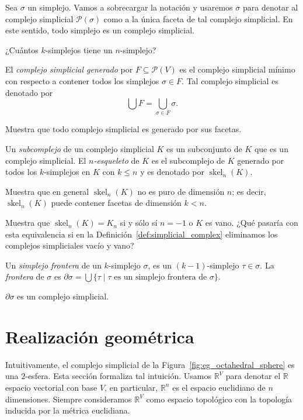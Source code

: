 \documentclass{standalone}
\begin{document}
	Sea $\sigma$ un simplejo. Vamos a sobrecargar la notación y usaremos $\sigma$ para denotar al complejo simplicial $\mathcal{P}(\sigma)$ como a la única faceta de tal complejo simplicial. En este sentido, todo simplejo es un complejo simplicial.
	
	\begin{exercise}
		¿Cuántos $k$-simplejos tiene un $n$-simplejo?
	\end{exercise}
	
	El \emph{complejo simplicial generado} por $F\subseteq\mathcal{P}(V)$ es el complejo simplicial mínimo con respecto a contener todos los simplejos $\sigma\in F$. Tal complejo simplicial es denotado por 
	\[
	\bigcup F=\bigcup_{\sigma\in F}\sigma.
	\]
	
	\begin{exercise}
		Muestra que todo complejo simplicial es generado por sus facetas.
	\end{exercise}
	
	Un \emph{subcomplejo} de un complejo simplicial $K$ es un subconjunto de $K$ que es un complejo simplicial. El \emph{$n$-esqueleto} de $K$ es el subcomplejo de $K$ generado por todos los $k$-simplejos en $K$ con $k\leq n$ y es denotado por $\operatorname{skel}_{n}(K)$.
	
	\begin{exercise}
		Muestra que en general $\operatorname{skel}_{n}(K)$ no es puro de dimensión $n$; es decir, $\operatorname{skel}_{n}(K)$ puede contener facetas de dimensión $k < n$.
	\end{exercise}
	
	\begin{exercise}
		Muestra que $\operatorname{skel}_{n}(K)=K_{n}$ si y sólo sí $n=-1$ o $K$ es vano. ¿Qué pasaría con esta equivalencia si en la Definición~\ref{def:simplicial_complex} eliminamos los complejos simpliciales vacío y vano?
	\end{exercise}	
	
	Un \emph{simplejo frontera} de un $k$-simplejo $\sigma$, es un $(k-1)$-simplejo $\tau\in\sigma$. La \emph{frontera} de $\sigma$ es $\partial\sigma=\bigcup\{\tau\mid\tau\text{ es un simplejo frontera de }\sigma\}$.
	
	\begin{exercise}
		$\partial\sigma$ es un complejo simplicial.
	\end{exercise}
	
	\section{Realización geométrica}
	\noindent Intuitivamente, el complejo simplicial de la Figura~\ref{fig:eg_octahedral_sphere} es una $2$-esfera. Esta sección formaliza tal intuición. Usamos $\mathbb{R}^{V}$ para denotar el $\mathbb{R}$ espacio vectorial con base $V$, en particular, $\mathbb{R}^{n}$ es el espacio euclidiano de $n$ dimensiones. Siempre consideramos $\mathbb{R}^{V}$ como espacio topológico con la topología inducida por la métrica euclidiana.
	
\end{document}
